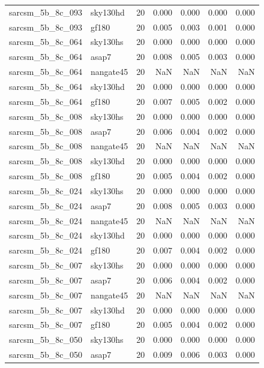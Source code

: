 \begin{tabular}{llrrrrr}
sarcsm\_5b\_8c\_093 & sky130hd & 20 & 0.000 & 0.000 & 0.000 & 0.000 \\
sarcsm\_5b\_8c\_093 & gf180 & 20 & 0.005 & 0.003 & 0.001 & 0.000 \\
sarcsm\_5b\_8c\_064 & sky130hs & 20 & 0.000 & 0.000 & 0.000 & 0.000 \\
sarcsm\_5b\_8c\_064 & asap7 & 20 & 0.008 & 0.005 & 0.003 & 0.000 \\
sarcsm\_5b\_8c\_064 & nangate45 & 20 & NaN & NaN & NaN & NaN \\
sarcsm\_5b\_8c\_064 & sky130hd & 20 & 0.000 & 0.000 & 0.000 & 0.000 \\
sarcsm\_5b\_8c\_064 & gf180 & 20 & 0.007 & 0.005 & 0.002 & 0.000 \\
sarcsm\_5b\_8c\_008 & sky130hs & 20 & 0.000 & 0.000 & 0.000 & 0.000 \\
sarcsm\_5b\_8c\_008 & asap7 & 20 & 0.006 & 0.004 & 0.002 & 0.000 \\
sarcsm\_5b\_8c\_008 & nangate45 & 20 & NaN & NaN & NaN & NaN \\
sarcsm\_5b\_8c\_008 & sky130hd & 20 & 0.000 & 0.000 & 0.000 & 0.000 \\
sarcsm\_5b\_8c\_008 & gf180 & 20 & 0.005 & 0.004 & 0.002 & 0.000 \\
sarcsm\_5b\_8c\_024 & sky130hs & 20 & 0.000 & 0.000 & 0.000 & 0.000 \\
sarcsm\_5b\_8c\_024 & asap7 & 20 & 0.008 & 0.005 & 0.003 & 0.000 \\
sarcsm\_5b\_8c\_024 & nangate45 & 20 & NaN & NaN & NaN & NaN \\
sarcsm\_5b\_8c\_024 & sky130hd & 20 & 0.000 & 0.000 & 0.000 & 0.000 \\
sarcsm\_5b\_8c\_024 & gf180 & 20 & 0.007 & 0.004 & 0.002 & 0.000 \\
sarcsm\_5b\_8c\_007 & sky130hs & 20 & 0.000 & 0.000 & 0.000 & 0.000 \\
sarcsm\_5b\_8c\_007 & asap7 & 20 & 0.006 & 0.004 & 0.002 & 0.000 \\
sarcsm\_5b\_8c\_007 & nangate45 & 20 & NaN & NaN & NaN & NaN \\
sarcsm\_5b\_8c\_007 & sky130hd & 20 & 0.000 & 0.000 & 0.000 & 0.000 \\
sarcsm\_5b\_8c\_007 & gf180 & 20 & 0.005 & 0.004 & 0.002 & 0.000 \\
sarcsm\_5b\_8c\_050 & sky130hs & 20 & 0.000 & 0.000 & 0.000 & 0.000 \\
sarcsm\_5b\_8c\_050 & asap7 & 20 & 0.009 & 0.006 & 0.003 & 0.000 \\

\end{tabular}
